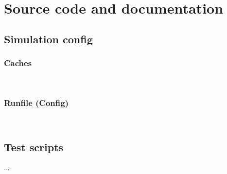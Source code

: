 \documentclass[12pt,twoside]{reedthesis}
\begin{document}
\chapter{Source code and documentation}

\section{Simulation config}

\subsection*{Caches}
%
\;\\

\subsection*{Runfile (Config)}
%
\;\\

\section{Test scripts}

...

\backmatter %

\nocite{*}
\printbibliography[title=References]
\end{document}
